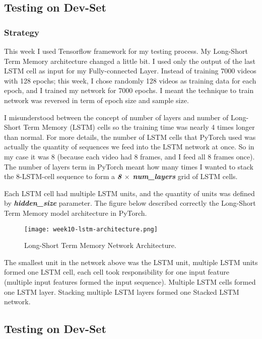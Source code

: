 
\subsection{Testing on Dev-Set}
\subsubsection{Strategy}
This week I used Tensorflow framework for my testing process. My Long-Short Term Memory architecture changed a little bit. I used only the output of the last LSTM cell as input for my Fully-connected Layer. Instead of training 7000 videos with 128 epochs; this week, I chose randomly 128 videos as training data for each epoch, and I trained my network for 7000 epochs. I meant the technique to train network was reversed in term of epoch size and sample size. 








I misunderstood between the concept of number of layers and number of Long-Short Term Memory (LSTM) cells so the training time was nearly 4 times longer than normal. For more details, the number of LSTM cells that PyTorch used was actually the quantity of sequences we feed into the LSTM network at once. So in my case it was 8 (because each video had 8 frames, and I feed all 8 frames once). The number of layers term in PyTorch meant how many times I wanted to stack the 8-LSTM-cell sequence to form a  \textbf{\emph{8 \( \times \) num\_layers}} grid of LSTM cells.

Each LSTM cell had multiple LSTM units, and the quantity of units was defined by \textbf{\emph{hidden\_size}} parameter. The figure below described correctly the Long-Short Term Memory model architecture in PyTorch.

\begin{figure}[!ht]
\centering
\texttt{[image: week10-lstm-architecture.png]}
\caption{Long-Short Term Memory Network Architecture.}
\end{figure}

The smallest unit in the network above was the LSTM unit, multiple LSTM units formed one LSTM cell, each cell took responsibility for one input feature (multiple input features formed the input sequence). Multiple LSTM cells formed one LSTM layer. Stacking multiple LSTM layers formed one Stacked LSTM network.

\subsection{Testing on Dev-Set}
